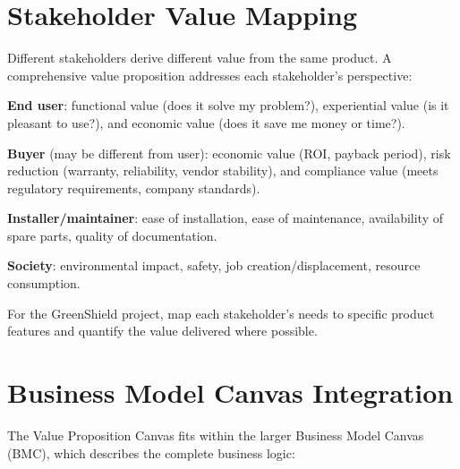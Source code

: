 \section{Stakeholder Value Mapping}
Different stakeholders derive different value from the same product. A comprehensive value proposition addresses each stakeholder's perspective:

\textbf{End user}: functional value (does it solve my problem?), experiential value (is it pleasant to use?), and economic value (does it save me money or time?).

\textbf{Buyer} (may be different from user): economic value (ROI, payback period), risk reduction (warranty, reliability, vendor stability), and compliance value (meets regulatory requirements, company standards).

\textbf{Installer/maintainer}: ease of installation, ease of maintenance, availability of spare parts, quality of documentation.

\textbf{Society}: environmental impact, safety, job creation/displacement, resource consumption.

For the GreenShield project, map each stakeholder's needs to specific product features and quantify the value delivered where possible.

\section{Business Model Canvas Integration}
The Value Proposition Canvas fits within the larger Business Model Canvas (BMC), which describes the complete business logic:

